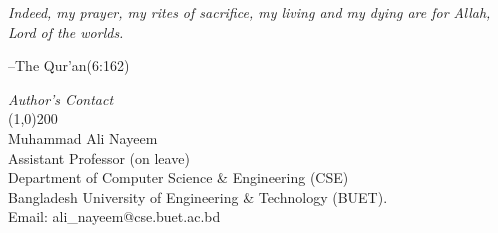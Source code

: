  \vspace{40cm}
 	 \textit{\Large Indeed, my prayer, my rites of sacrifice, my living and my dying are for Allah, Lord of the worlds.}  \begin{flushright}\Large --The Qur'an(6:162)\\\end{flushright}
 \vspace{11cm}
 \begin{flushright}
 \textit{\Large \sc Author's Contact}\\
 \line(1,0){200}\\
 Muhammad Ali Nayeem\\
 Assistant Professor (on leave)\\
 Department of Computer Science \& Engineering (CSE)\\
 Bangladesh University of Engineering \& Technology (BUET).\\
 Email:
 {ali\_nayeem@cse.buet.ac.bd}
 \end{flushright}
 \newpage
 \vspace*{-3.7cm}
